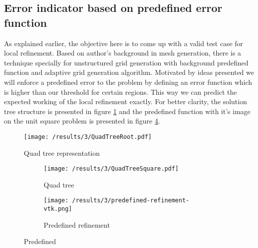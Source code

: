\subsection{Error indicator based on predefined error function}
As explained earlier, the objective here is to come up with a valid test case for local refinement. Based on author's background in mesh generation, there is a technique specially for unstructured grid generation with background predefined function \cite{Henshaw1996} and adaptive grid generation algorithm\cite{Ebeida2010}. Motivated by ideas presented we will enforce a predefined error to the problem by defining an error function which is higher than our threshold for certain regions. This way we can predict the expected working of the local refinement exactly. For better clarity, the solution tree structure is presented in figure \ref{fig:QuadTreeRoot} and the predefined function with it's image on the unit square problem is presented in figure \ref{fig:Predef}.\\


\begin{figure}[h]
	\centering
	    \texttt{[image: /results/3/QuadTreeRoot.pdf]}
		\centering
        \caption{Quad tree representation}
        \label{fig:QuadTreeRoot}
\end{figure}


		
\begin{figure}[h]
	\centering
    \begin{subfigure}[b]{0.66\textwidth}    
	    \texttt{[image: /results/3/QuadTreeSquare.pdf]}
		\centering    
		\caption{Quad tree}
		\label{fig:QuadTreeSquare}
    \end{subfigure} 
    \begin{subfigure}[b]{0.75\textwidth}
	    \texttt{[image: /results/3/predefined-refinement-vtk.png]}
		\centering
        \caption{Predefined refinement}
        \label{fig:PredefRefine}
    \end{subfigure} 
    \caption{Predefined}
    \label{fig:Predef}
\end{figure}


